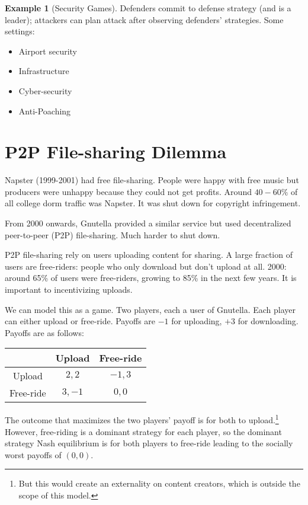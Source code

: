 \documentclass[dvipsnames]{article}
\theoremstyle{definition}
\newtheorem{example}[definition]{Example}
\theoremstyle{remark}
\begin{document}
\begin{example}[Security Games]
	Defenders commit to defense strategy (and is a leader); attackers can plan attack after observing defenders' strategies. Some settings: 
	\begin{itemize}
		\item Airport security
		\item Infrastructure
		\item Cyber-security 
		\item Anti-Poaching
	\end{itemize}
\end{example}

\newpage

\section{P2P File-sharing Dilemma}

Napster (1999-2001) had free file-sharing. People were happy with free music but producers were unhappy because they could not get profits. Around $40-60\%$ of all college dorm traffic was Napster. It was shut down for copyright infringement. 

From 2000 onwards, Gnutella provided a similar service but used decentralized peer-to-peer (P2P) file-sharing. Much harder to shut down.

P2P file-sharing rely on users uploading content for sharing. A large fraction of users are free-riders: people who only download but don't upload at all. 2000: around 65\% of users were free-riders, growing to 85\% in the next few years. It is important to incentivizing uploads. 

We can model this as a game. Two players, each a user of Gnutella. Each player can either upload or free-ride. Payoffs are $-1$ for uploading, $+3$ for downloading. Payoffs are as follows: 

\begin{table}[h]\centering
	\begin{tabular}{c|c|c|}
		& Upload & Free-ride\\ \hline
		Upload & $2,2$ & $-1,3$  \\ \hline
		Free-ride & $3,-1$ & $0,0$ \\ \hline
	\end{tabular}
\end{table}

The outcome that maximizes the two players' payoff is for both to upload.\footnote{But this would create an externality on content creators, which is outside the scope of this model.} However, free-riding is a dominant strategy for each player, so the dominant strategy Nash equilibrium is for both players to free-ride leading to the socially worst payoffs of $(0,0)$.
\end{document}
